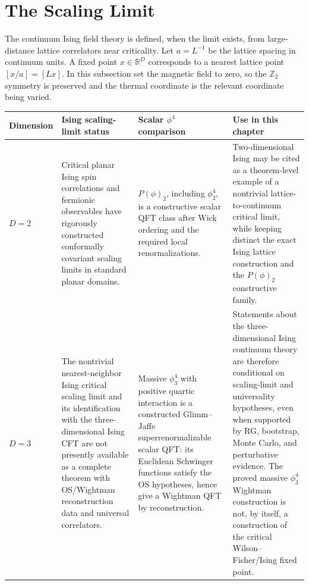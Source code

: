 \section{The Scaling Limit}

The continuum Ising field theory is defined, when the limit exists, from
large-distance lattice correlators near criticality.  Let \(a=L^{-1}\) be the
lattice spacing in continuum units.  A fixed point \(x\in\mathbb R^D\)
corresponds to a nearest lattice point \([x/a]=[Lx]\).  In this subsection set
the magnetic field to zero, so the \(\mathbb Z_2\) symmetry is preserved and
the thermal coordinate is the relevant coordinate being varied.

\begin{table}[H]
\centering
\footnotesize
\begin{tabular}{@{}>{\raggedright\arraybackslash}p{}
  >{\raggedright\arraybackslash}p{}
  >{\raggedright\arraybackslash}p{}
  >{\raggedright\arraybackslash}p{}@{}}
\hline
Dimension & Ising scaling-limit status & Scalar \(\phi^4\) comparison &
Use in this chapter \\
\hline
\(D=2\) &
Critical planar Ising spin correlations and fermionic observables have
rigorously constructed conformally covariant scaling limits in standard
planar domains. &
\(P(\phi)_2\), including \(\phi^4_2\), is a constructive scalar QFT class
after Wick ordering and the required local renormalizations. &
Two-dimensional Ising may be cited as a theorem-level example of a
nontrivial lattice-to-continuum critical limit, while keeping distinct the
exact Ising lattice construction and the \(P(\phi)_2\) constructive family. \\
\(D=3\) &
The nontrivial nearest-neighbor Ising critical scaling limit and its
identification with the three-dimensional Ising CFT are not presently
available as a complete theorem with OS/Wightman reconstruction data and
universal correlators. &
Massive \(\phi^4_3\) with positive quartic interaction is a constructed
Glimm--Jaffe superrenormalizable scalar QFT: its Euclidean Schwinger
functions satisfy the OS hypotheses, hence give a Wightman QFT by
reconstruction. &
Statements about the three-dimensional Ising continuum theory are therefore
conditional on scaling-limit and universality hypotheses, even when supported
by RG, bootstrap, Monte Carlo, and perturbative evidence.  The proved massive
\(\phi^4_3\) Wightman construction is not, by itself, a construction of the
critical Wilson--Fisher/Ising fixed point. \\

\end{tabular}
\end{table}
